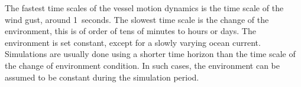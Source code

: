 \documentclass[journal]{IEEEtran}
\newcommand{\vect}[1]{\boldsymbol{#1}}
\begin{document}
%
%
%
%
%
%


The fastest time scales of the vessel motion dynamics is the time scale of the wind gust, around 1~seconds.
The slowest time scale is the change of the environment, this is of order of tens of minutes to hours or days.
The environment is set constant, except for a slowly varying ocean current.
Simulations are usually done using a shorter time horizon than the time scale of the change of environment condition.
In such cases, the environment can be assumed to be constant during the simulation period.
\end{document}

